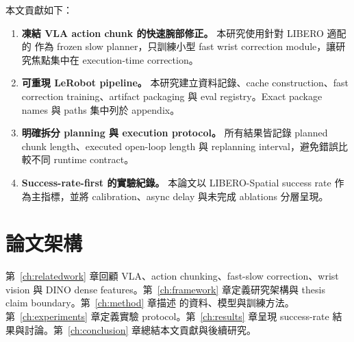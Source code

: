 本文貢獻如下：

\begin{enumerate}
  \item \textbf{凍結 VLA action chunk 的快速腕部修正。} 本研究使用針對 LIBERO 適配的 \smolvla{} 作為 frozen slow planner，只訓練小型 fast wrist correction module，讓研究焦點集中在 execution-time correction。
  \item \textbf{可重現 LeRobot pipeline。} 本研究建立資料記錄、cache construction、fast correction training、artifact packaging 與 eval registry。Exact package names 與 paths 集中列於 appendix。
  \item \textbf{明確拆分 planning 與 execution protocol。} 所有結果皆記錄 planned chunk length、executed open-loop length 與 replanning interval，避免錯誤比較不同 runtime contract。
  \item \textbf{Success-rate-first 的實驗紀錄。} 本論文以 LIBERO-Spatial success rate 作為主指標，並將 calibration、async delay 與未完成 ablations 分層呈現。
\end{enumerate}

\section{論文架構}

第~\ref{ch:relatedwork} 章回顧 VLA、action chunking、fast-slow correction、wrist vision 與 DINO dense features。第~\ref{ch:framework} 章定義研究架構與 thesis claim boundary。第~\ref{ch:method} 章描述 \method{} 的資料、模型與訓練方法。第~\ref{ch:experiments} 章定義實驗 protocol。第~\ref{ch:results} 章呈現 success-rate 結果與討論。第~\ref{ch:conclusion} 章總結本文貢獻與後續研究。
